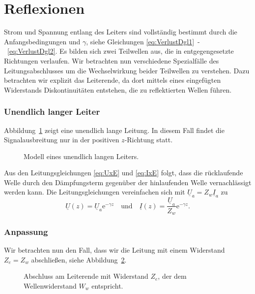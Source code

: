 \documentclass[paper=a4, parskip=half-, ngerman, fontsize=11pt]{scrreprt}
\begin{document}
\section{Reflexionen}

Strom und Spannung entlang des Leiters sind vollständig bestimmt durch die Anfangsbedingungen und $\gamma$, siehe
Gleichungen \eqref{eq:VerlustDgl1}~-~\eqref{eq:VerlustDgl2}. Es bilden sich zwei Teilwellen aus, die in
entgegengesetzte Richtungen verlaufen. Wir betrachten nun verschiedene Spezialfälle des Leitungsabschlusses um die
Wechselwirkung beider Teilwellen zu verstehen. Dazu betrachten wir explizit das Leiterende, da dort mittels eines
eingefügten Widerstands Diskontinuitäten entstehen, die zu reflektierten Wellen führen.

\subsubsection{Unendlich langer Leiter}

Abbildung~\ref{OhneAbschluss} zeigt eine unendlich lange Leitung. In diesem Fall findet die Signalausbreitung nur in
der positiven $z$-Richtung statt.
\begin{figure}[!htb]
    \begin{center}
        
        \caption{Modell eines unendlich langen Leiters.}
        \label{OhneAbschluss}
    \end{center}
\end{figure}
Aus den Leitungsgleichungen \eqref{eq:UxE} und \eqref{eq:IxE} folgt, dass die rücklaufende Welle durch den
Dämpfungsterm gegenüber der hinlaufenden Welle vernachlässigt werden kann. Die Leitungsgleichungen vereinfachen sich
mit $\underline{U}_{a} = Z_{w} \underline{I}_{a}$ zu
\[ \underline{U}(z) = \underline{U}_{a} \mathrm{e}^{- \gamma z} \quad \text{und} \quad
 \underline{I}(z) = \frac{\underline{U}_{a}}{Z_{w}} \mathrm{e}^{- \gamma z}. \]

\subsubsection{Anpassung}
Wir betrachten nun den Fall, dass wir die Leitung mit einem Widerstand $Z_{e} = Z_{w}$ abschließen, siehe
Abbildung~\ref{AbschlussMitWiderstand}.
\begin{figure}[!htb]
    \begin{center}
        
        \caption{Abschluss am Leiterende mit Widerstand $Z_{e}$, der dem Wellenwiderstand $W_{w}$ entspricht.}
        \label{AbschlussMitWiderstand}
    \end{center}
\end{figure}
\end{document}
